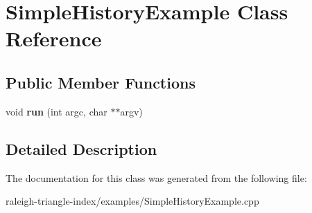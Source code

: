 \section{Simple\+History\+Example Class Reference}
\label{class_simple_history_example}
\subsection*{Public Member Functions}
\begin{DoxyCompactItemize}
\item 
void {\bfseries run} (int argc, char $\ast$$\ast$argv)\label{class_simple_history_example_a35f4d8df6e0a73d723c6bcb1d780215e}

\end{DoxyCompactItemize}


\subsection{Detailed Description}


The documentation for this class was generated from the following file\+:\begin{DoxyCompactItemize}
\item 
raleigh-\/triangle-\/index/examples/Simple\+History\+Example.\+cpp\end{DoxyCompactItemize}
